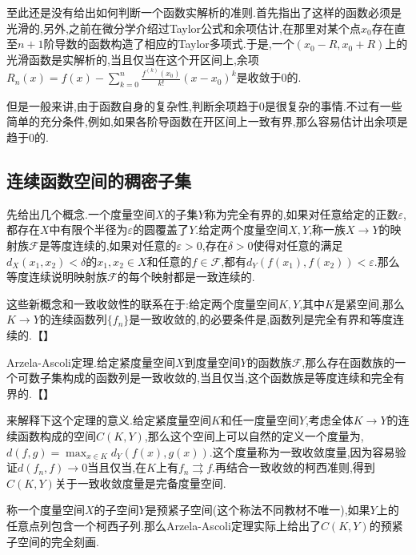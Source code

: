 至此还是没有给出如何判断一个函数实解析的准则.首先指出了这样的函数必须是光滑的,另外,之前在微分学介绍过Taylor公式和余项估计,在那里对某个点$x_0$存在直至$n+1$阶导数的函数构造了相应的Taylor多项式.于是,一个$(x_0-R,x_0+R)$上的光滑函数是实解析的,当且仅当在这个开区间上,余项$R_n(x)=f(x)-\sum_{k=0}^{n}\frac{f^{(k)}(x_0)}{k!}(x-x_0)^k$是收敛于0的.

但是一般来讲,由于函数自身的复杂性,判断余项趋于0是很复杂的事情.不过有一些简单的充分条件,例如,如果各阶导函数在开区间上一致有界,那么容易估计出余项是趋于0的.
\newpage
\subsection{连续函数空间的稠密子集}

先给出几个概念.一个度量空间$X$的子集$Y$称为完全有界的,如果对任意给定的正数$\varepsilon$,都存在$X$中有限个半径为$\varepsilon$的圆覆盖了$Y$.给定两个度量空间$X,Y$,称一族$X\to Y$的映射族$\mathscr{F}$是等度连续的,如果对任意的$\varepsilon>0$,存在$\delta>0$使得对任意的满足$d_X(x_1,x_2)<\delta$的$x_1,x_2\in X$和任意的$f\in\mathscr{F}$,都有$d_Y(f(x_1),f(x_2))<\varepsilon$.那么等度连续说明映射族$\mathscr{F}$的每个映射都是一致连续的.

这些新概念和一致收敛性的联系在于:给定两个度量空间$K,Y$,其中$K$是紧空间,那么$K\to Y$的连续函数列$\{f_n\}$是一致收敛的,的必要条件是,函数列是完全有界和等度连续的.【】

Arzela-Ascoli定理.给定紧度量空间$X$到度量空间$Y$的函数族$\mathscr{F}$,那么存在函数族的一个可数子集构成的函数列是一致收敛的,当且仅当,这个函数族是等度连续和完全有界的.【】

来解释下这个定理的意义.给定紧度量空间$K$和任一度量空间$Y$,考虑全体$K\to Y$的连续函数构成的空间$C(K,Y)$,那么这个空间上可以自然的定义一个度量为,$d(f,g)=\max_{x\in K}d_Y(f(x),g(x))$.这个度量称为一致收敛度量,因为容易验证$d(f_n,f)\to0$当且仅当,在$K$上有$f_n\rightrightarrows f$.再结合一致收敛的柯西准则,得到$C(K,Y)$关于一致收敛度量是完备度量空间.

称一个度量空间$X$的子空间$Y$是预紧子空间(这个称法不同教材不唯一),如果$Y$上的任意点列包含一个柯西子列.那么Arzela-Ascoli定理实际上给出了$C(K,Y)$的预紧子空间的完全刻画.

